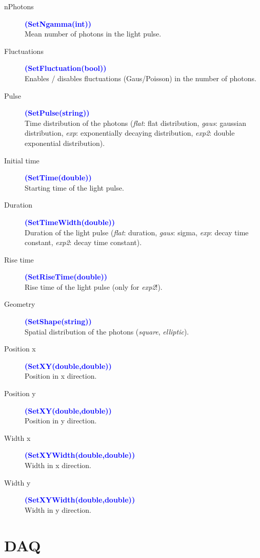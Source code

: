 \begin{description}
	\item[nPhotons] \textcolor{blue}{\textbf{(SetNgamma(int))}}\\
		Mean number of photons in the light pulse.
	\item[Fluctuations] \textcolor{blue}{\textbf{(SetFluctuation(bool))}}\\
		Enables / disables fluctuations (Gaus/Poisson) in the number of photons.
	\item[Pulse] \textcolor{blue}{\textbf{(SetPulse(string))}}\\
		Time distribution of the photons (\textit{flat}: flat distribution, \textit{gaus}: gaussian distribution, \textit{exp}: exponentially decaying distribution, \textit{exp2}: double exponential distribution).
	\item[Initial time] \textcolor{blue}{\textbf{(SetTime(double))}}\\
		Starting time of the light pulse.
	\item[Duration] \textcolor{blue}{\textbf{(SetTimeWidth(double))}}\\
		Duration of the light pulse (\textit{flat}: duration, \textit{gaus}: sigma, \textit{exp}: decay time constant, \textit{exp2}: decay time constant).
	\item[Rise time] \textcolor{blue}{\textbf{(SetRiseTime(double))}}\\
		Rise time of the light pulse (only for \textit{exp2}!).
	\item[Geometry] \textcolor{blue}{\textbf{(SetShape(string))}}\\
		Spatial distribution of the photons (\textit{square}, \textit{elliptic}).
	\item[Position x] \textcolor{blue}{\textbf{(SetXY(double,double))}}\\
		Position in x direction.
	\item[Position y] \textcolor{blue}{\textbf{(SetXY(double,double))}}\\
		Position in y direction.
	\item[Width x] \textcolor{blue}{\textbf{(SetXYWidth(double,double))}}\\
		Width in x direction.
	\item[Width y] \textcolor{blue}{\textbf{(SetXYWidth(double,double))}}\\
		Width in y direction.
\end{description}


\section{DAQ}

